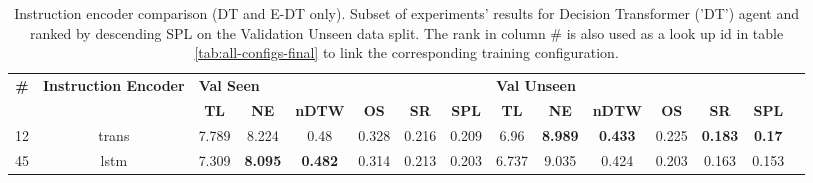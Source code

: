 \begin{table}
\centering
\caption{\label{tab:dt_instruction_encoding}Instruction encoder comparison (DT and E-DT only). Subset of experiments' results for Decision Transformer ('DT') agent and ranked by descending SPL on the Validation Unseen data split. The rank in column \# is also used as a look up id in table \ref{tab:all-configs-final} to link the corresponding training configuration.}
\begin{tabular}{@{\hskip3pt}c@{\hskip3pt}c@{\hskip3pt}c@{\hskip3pt}c@{\hskip3pt}c@{\hskip3pt}c@{\hskip3pt}c@{\hskip3pt}c@{\hskip3pt}c@{\hskip3pt}c@{\hskip3pt}c@{\hskip3pt}c@{\hskip3pt}c@{\hskip3pt}c@{\hskip3pt}c}
\toprule
\textbf{\#} & \textbf{Instruction Encoder} & \multicolumn{6}{l}{\textbf{Val Seen}} & \multicolumn{6}{l}{\textbf{Val Unseen}} \\
 \textbf{~} &                   \textbf{~} &       \textbf{TL} &     \textbf{NE} &   \textbf{nDTW} & \textbf{OS} & \textbf{SR} & \textbf{SPL} &         \textbf{TL} &     \textbf{NE} &   \textbf{nDTW} & \textbf{OS} &     \textbf{SR} &   \textbf{SPL} \\
\midrule
         12 &                        trans &             7.789 &           8.224 &            0.48 &       0.328 &       0.216 &        0.209 &                6.96 &  \textbf{8.989} &  \textbf{0.433} &       0.225 &  \textbf{0.183} &  \textbf{0.17} \\
         45 &                         lstm &             7.309 &  \textbf{8.095} &  \textbf{0.482} &       0.314 &       0.213 &        0.203 &               6.737 &           9.035 &           0.424 &       0.203 &           0.163 &          0.153 \\
\bottomrule
\end{tabular}
\end{table}

